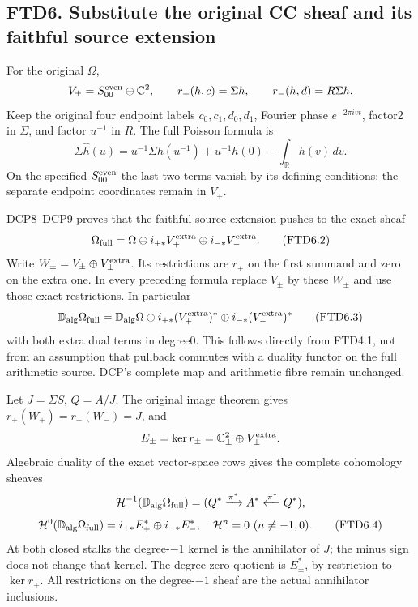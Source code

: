 \subsection{FTD6. Substitute the original CC sheaf and its faithful
source
extension}\label{ftd6.-substitute-the-original-cc-sheaf-and-its-faithful-source-extension}

For the original \(\Omega\), \[
V_\pm=S_{00}^{\rm even}\oplus\mathbb C^2,\qquad
r_+(h,c)=\Sigma h,\qquad r_-(h,d)=R\Sigma h.
\] Keep the original four endpoint labels \(c_0,c_1,d_0,d_1\), Fourier
phase \(e^{-2\pi ivt}\), factor2 in \(\Sigma\), and factor \(u^{-1}\) in
\(R\). The full Poisson formula is \[
\Sigma\widehat h(u)=u^{-1}\Sigma h(u^{-1})
+u^{-1}h(0)-\int_{\mathbb R}h(v)\,dv.
\tag{FTD6.1}
\] On the specified \(S_{00}^{\rm even}\) the last two terms vanish by
its defining conditions; the separate endpoint coordinates remain in
\(V_\pm\).

DCP8--DCP9 proves that the faithful source extension pushes to the exact
sheaf \[
\Omega_{\rm full}
=\Omega\oplus i_{+*}V_+^{\rm extra}\oplus i_{-*}V_-^{\rm extra}.
\tag{FTD6.2}
\] Write \(W_\pm=V_\pm\oplus V_\pm^{\rm extra}\). Its restrictions are
\(r_\pm\) on the first summand and zero on the extra one. In every
preceding formula replace \(V_\pm\) by these \(W_\pm\) and use those
exact restrictions. In particular \[
\mathbb D_{\rm alg}\Omega_{\rm full}
=\mathbb D_{\rm alg}\Omega
\oplus i_{+*}(V_+^{\rm extra})^*
\oplus i_{-*}(V_-^{\rm extra})^*
\tag{FTD6.3}
\] with both extra dual terms in degree0. This follows directly from
FTD4.1, not from an assumption that pullback commutes with a duality
functor on the full arithmetic source. DCP's complete map and arithmetic
fibre remain unchanged.

Let \(J=\Sigma S\), \(Q=A/J\). The original image theorem gives
\(r_+(W_+)=r_-(W_-)=J\), and \[
E_\pm=\ker r_\pm=\mathbb C^2_{\pm}\oplus V_\pm^{\rm extra}.
\] Algebraic duality of the exact vector-space rows gives the complete
cohomology sheaves \[
\mathcal H^{-1}(\mathbb D_{\rm alg}\Omega_{\rm full})
=(Q^*\xrightarrow{\pi^*}A^*\xleftarrow{\pi^*}Q^*),
\] \[
\mathcal H^0(\mathbb D_{\rm alg}\Omega_{\rm full})
=i_{+*}E_+^*\oplus i_{-*}E_-^*,
\quad \mathcal H^n=0\ (n\ne-1,0).
\tag{FTD6.4}
\] At both closed stalks the degree-\(-1\) kernel is the annihilator of
\(J\); the minus sign does not change that kernel. The degree-zero
quotient is \(E_\pm^*\), by restriction to \(\ker r_\pm\). All
restrictions on the degree-\(-1\) sheaf are the actual annihilator
inclusions.

